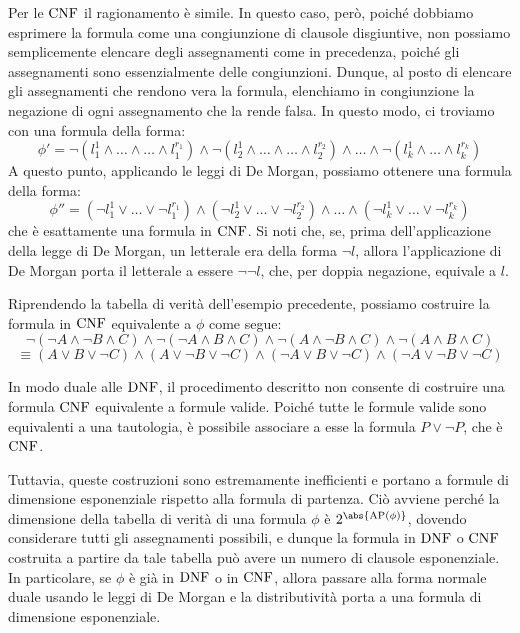 Per le \(\operatorname{CNF}\) il ragionamento è simile. 
In questo caso, però, poiché dobbiamo esprimere la formula come una congiunzione di clausole disgiuntive, non possiamo semplicemente elencare degli assegnamenti come in precedenza, poiché gli assegnamenti sono essenzialmente delle congiunzioni.
Dunque, al posto di elencare gli assegnamenti che rendono vera la formula, elenchiamo in congiunzione la negazione di ogni assegnamento che la rende falsa. 
In questo modo, ci troviamo con una formula della forma:
\[\phi' = \neg(l_1^1 \land \ldots \land \ldots \land l_1^{r_1})\land\neg(l_2^{1}\land \ldots \land \ldots\land l_2^{r_2})\land\ldots\land \neg(l_k^1\land\ldots\land l_k^{r_k})\]
A questo punto, applicando le leggi di De Morgan, possiamo ottenere una formula della forma:
\[\phi'' = (\neg l_1^1 \lor \ldots \lor \neg l_1^{r_1})\land(\neg l_2^1 \lor \ldots \lor \neg l_2^{r_2})\land\ldots\land (\neg l_k^1 \lor \ldots \lor \neg l_k^{r_k})\]
che è esattamente una formula in \(\operatorname{CNF}\).
Si noti che, se, prima dell'applicazione della legge di De Morgan, un letterale era della forma \(\neg l\), allora l'applicazione di De Morgan porta il letterale a essere \(\neg \neg l\), che, per doppia negazione, equivale a \(l\).

\begin{example}{}
  Riprendendo la tabella di verità dell'esempio precedente, possiamo costruire la formula in \(\operatorname{CNF}\) equivalente a \(\phi\) come segue:
  \[\neg(\neg A \land \neg B \land C) \land \neg(\neg A \land B \land C) \land \neg(A \land \neg B \land C) \land \neg(A \land B \land C)\]
  \[\equiv (A \lor B \lor \neg C) \land (A \lor \neg B \lor \neg C) \land (\neg A \lor B \lor \neg C) \land (\neg A \lor \neg B \lor \neg C)\]
\end{example}

\begin{note}{}
  In modo duale alle \(\operatorname{DNF}\), il procedimento descritto non consente di costruire una formula \(\operatorname{CNF}\) equivalente a formule valide.
  Poiché tutte le formule valide sono equivalenti a una tautologia, è possibile associare a esse la formula \(P \lor \neg P\), che è \(\operatorname{CNF}\).
\end{note}

Tuttavia, queste costruzioni sono estremamente inefficienti e portano a formule di dimensione esponenziale rispetto alla formula di partenza. 
Ciò avviene perché la dimensione della tabella di verità di una formula \(\phi\) è \(2^{\abs{\AP[\phi]}}\), dovendo considerare tutti gli assegnamenti possibili, e dunque la formula in \(\operatorname{DNF}\) o \(\operatorname{CNF}\) costruita a partire da tale tabella può avere un numero di clausole esponenziale. 
In particolare, se \(\phi\) è già in \(\operatorname{DNF}\) o in \(\operatorname{CNF}\), allora passare alla forma normale duale usando le leggi di De Morgan e la distributività porta a una formula di dimensione esponenziale.

